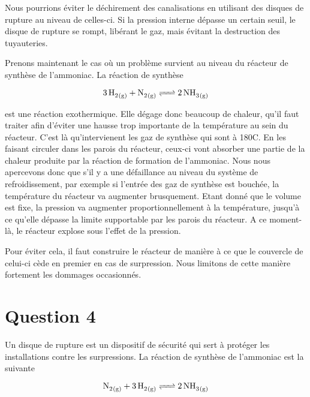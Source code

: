 \documentclass[a4paper,oneside,12pt]{article}
\begin{document}
Nous pourrions éviter le déchirement des canalisations en utilisant des disques de rupture au niveau de celles-ci. 
Si la pression interne dépasse un certain seuil, le disque de rupture se rompt, libérant le gaz, mais évitant la destruction des tuyauteries.
\newline

Prenons maintenant le cas où un problème survient au niveau du réacteur de synthèse de l'ammoniac. La réaction de synthèse

\begin{equation*}
	\ce{3 \, H2_{(g)} + N2_{(g)} <=> {2} \, NH3_{(g)}} 
\end{equation*}

est une réaction exothermique. Elle dégage donc beaucoup de chaleur, qu'il faut traiter afin d'éviter une hausse trop importante de la température au sein du réacteur. 
C'est là qu'intervienent les gaz de synthèse  qui sont à 180{\degre}C. 
En les faisant circuler dans les parois du réacteur, ceux-ci vont absorber une partie de la chaleur produite par la réaction de formation de l'ammoniac. 
Nous nous apercevons donc que s'il y a une défaillance au niveau du système de refroidissement, par exemple si l'entrée des gaz de synthèse est bouchée, la température du réacteur va augmenter brusquement. 
Etant donné que le volume est fixe, la pression va augmenter proportionnellement à la température, jusqu'à ce qu'elle dépasse la limite supportable par les parois du réacteur. 
A ce moment-là, le réacteur explose sous l'effet de la pression.
\newline

Pour éviter cela, il faut construire le réacteur de manière à ce que le couvercle de celui-ci cède en premier en cas de surpression. Nous limitons de cette manière fortement les dommages occasionnés.

\section*{Question 4}

Un disque de rupture est un dispositif de sécurité qui sert à protéger les installations 
contre les surpressions.
La réaction de synthèse de l'ammoniac est la suivante

\[
	\ce{N2_{(g)} + 3H2_{(g)} <=> 2NH3_{(g)}}
\]
\end{document}
